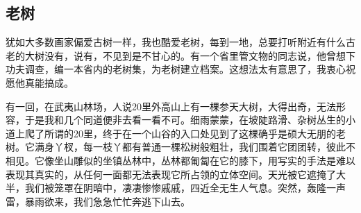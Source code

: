 \documentclass{article}
\begin{document}
\subsection{老树}
犹如大多数画家偏爱古树一样，我也酷爱老树，每到一地，总要打听附近有什么古老的大树没有，说有，不见到是不甘心的。有一个省里管文物的同志说，他曾想下功夫调查，编一本省内的老树集，为老树建立档案。这想法太有意思了，我衷心祝愿他真能搞成。

有一回，在武夷山林场，人说20里外高山上有一棵参天大树，大得出奇，无法形容，于是我和几个同道便非去看一看不可。细雨蒙蒙，在坡陡路滑、杂树丛生的小道上爬了所谓的20里，终于在一个山谷的入口处见到了这棵确乎是硕大无朋的老树。它满身丫杈，每一枝丫都有普通一棵松树般粗壮，我们围着它团团转，彼此不相见。它像坐山雕似的坐镇丛林中，丛林都匍匐在它的膝下，用写实的手法是难以表现其真实的，从任何一面都无法表现它所占领的立体空间。天光被它遮掩了大半，我们被笼罩在阴暗中，凄凄惨惨戚戚，四近全无生人气息。突然，轰隆一声雷，暴雨欲来，我们急急忙忙奔逃下山去。
\end{document}
